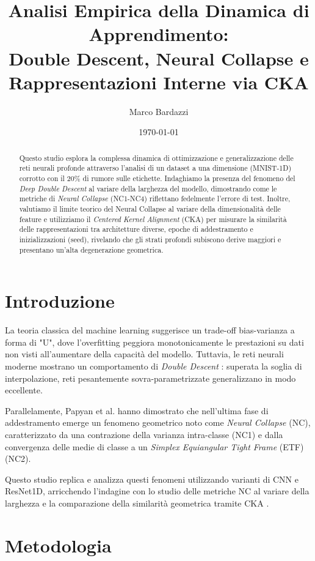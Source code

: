 \documentclass[10pt,twocolumn,letterpaper]{article}
\title{\Large \bf Analisi Empirica della Dinamica di Apprendimento: \\ Double Descent, Neural Collapse e Rappresentazioni Interne via CKA}
\author{Marco Bardazzi}
\date{\today}
\begin{document}
\maketitle

\begin{abstract}
Questo studio esplora la complessa dinamica di ottimizzazione e generalizzazione delle reti neurali profonde attraverso l'analisi di un dataset a una dimensione (MNIST-1D) corrotto con il 20\% di rumore sulle etichette. Indaghiamo la presenza del fenomeno del \textit{Deep Double Descent} al variare della larghezza del modello, dimostrando come le metriche di \textit{Neural Collapse} (NC1-NC4) riflettano fedelmente l'errore di test. Inoltre, valutiamo il limite teorico del Neural Collapse al variare della dimensionalità delle feature e utilizziamo il \textit{Centered Kernel Alignment} (CKA) per misurare la similarità delle rappresentazioni tra architetture diverse, epoche di addestramento e inizializzazioni (seed), rivelando che gli strati profondi subiscono derive maggiori e presentano un'alta degenerazione geometrica.
\end{abstract}

\section{Introduzione}
La teoria classica del machine learning suggerisce un trade-off bias-varianza a forma di "U", dove l'overfitting peggiora monotonicamente le prestazioni su dati non visti all'aumentare della capacità del modello. Tuttavia, le reti neurali moderne mostrano un comportamento di \textit{Double Descent} \cite{belkin2019}: superata la soglia di interpolazione, reti pesantemente sovra-parametrizzate generalizzano in modo eccellente. 

Parallelamente, Papyan et al. \cite{papyan2020} hanno dimostrato che nell'ultima fase di addestramento emerge un fenomeno geometrico noto come \textit{Neural Collapse} (NC), caratterizzato da una contrazione della varianza intra-classe (NC1) e dalla convergenza delle medie di classe a un \textit{Simplex Equiangular Tight Frame} (ETF) (NC2). 

Questo studio replica e analizza questi fenomeni utilizzando varianti di CNN e ResNet1D, arricchendo l'indagine con lo studio delle metriche NC al variare della larghezza e la comparazione della similarità geometrica tramite CKA \cite{kornblith2019}.

\section{Metodologia}
\end{document}
